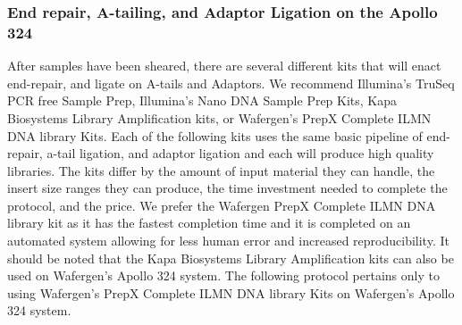 \documentclass[graybox]{svmult}
\begin{document}
\subsubsection{End repair, A-tailing, and Adaptor Ligation on the Apollo 324}

After samples have been sheared, there are several different kits that will enact end-repair, and ligate on A-tails and Adaptors. We recommend Illumina’s TruSeq PCR free Sample Prep, Illumina’s Nano DNA Sample Prep Kits, Kapa Biosystems Library Amplification kits, or Wafergen’s PrepX Complete ILMN DNA library Kits. Each of the following kits uses the same basic pipeline of end-repair, a-tail ligation, and adaptor ligation and each will produce high quality libraries. The kits differ by the amount of input material they can handle, the insert size ranges they can produce, the time investment needed to complete the protocol, and the price. We prefer the Wafergen PrepX Complete ILMN DNA library kit as it has the fastest completion time and it is completed on an automated system allowing for less human error and increased reproducibility. It should be noted that the Kapa Biosystems Library Amplification kits can also be used on Wafergen’s Apollo 324 system. The following protocol pertains only to using Wafergen’s PrepX Complete ILMN DNA library Kits on Wafergen’s Apollo 324 system.
\end{document}
